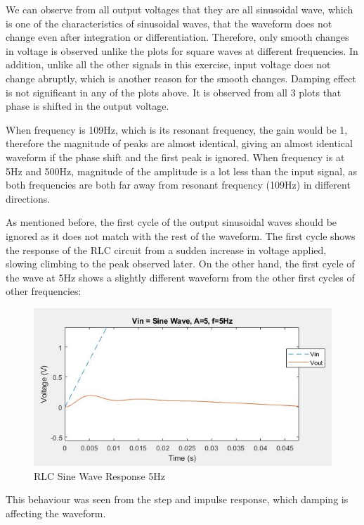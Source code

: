 \documentclass[11pt, oneside, titlepage]{article}   	%
\begin{document}
We can observe from all output voltages that they are all sinusoidal wave, which is one of the characteristics of sinusoidal waves, that the waveform does not change even after integration or differentiation. Therefore, only smooth changes in voltage is observed unlike the plots for square waves at different frequencies. In addition, unlike all the other signals in this exercise, input voltage does not change abruptly, which is another reason for the smooth changes. Damping effect is not significant in any of the plots above. It is observed from all 3 plots that phase is shifted in the output voltage.

When frequency is 109Hz, which is its resonant frequency, the gain would be 1, therefore the magnitude of peaks are almost identical, giving an almost identical waveform if the phase shift and the first peak is ignored. When frequency is at 5Hz and 500Hz, magnitude of the amplitude is a lot less than the input signal, as both frequencies are both far away from resonant frequency (109Hz) in different directions. 

As mentioned before, the first cycle of the output sinusoidal waves should be ignored as it does not match with the rest of the waveform. The first cycle shows the response of the RLC circuit from a sudden increase in voltage applied, slowing climbing to the peak observed later. On the other hand, the first cycle of the wave at 5Hz shows a slightly different waveform from the other first cycles of other frequencies:

\begin{figure}[H]
\center
\includegraphics[scale = 0.5]{exercise3_8}
\caption{RLC Sine Wave Response 5Hz} \label{fig:ex3_8}
\end{figure}

This behaviour was seen from the step and impulse response, which damping is affecting the waveform.
\end{document}
